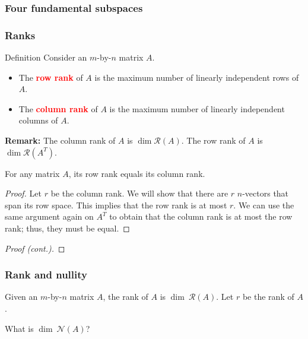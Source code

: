 \begin{frame}
  \frametitle{Four fundamental subspaces}
\end{frame}

\begin{frame}
  \frametitle{Ranks}

  \begin{block}{Definition}
    Consider an $m$-by-$n$ matrix $A$.
    \begin{itemize}
    \item The \textcolor{red}{\bf row rank} of $A$ is the maximum
      number of linearly independent rows of $A$.
    \item The \textcolor{red}{\bf column rank} of $A$ is the maximum
      number of linearly independent columns of $A$.
    \end{itemize}
  \end{block}

  \vspace{0.2in}

  {\bf Remark:} The column rank of $A$ is $\dim {\mathcal R}(A)$.  The
  row rank of $A$ is $\dim {\mathcal R}(A^T)$.
\end{frame}

\begin{frame}
  \begin{theorem}
    For any matrix $A$, its row rank equals its column rank.
  \end{theorem}

  \begin{proof}
    Let $r$ be the column rank.  We will show that there are $r$
    $n$-vectors that span its row space.  This implies that the row
    rank is at most $r$.  We can use the same argument again on $A^T$
    to obtain that the column rank is at most the row rank; thus, they
    must be equal.

    \vspace{1.5in}
  \end{proof}
  
\end{frame}

\begin{frame}
  \begin{proof}[Proof (cont.)]
    \vspace{3in}
  \end{proof}
\end{frame}

\begin{frame}
  \frametitle{Rank and nullity}

  Given an $m$-by-$n$ matrix $A$, the rank of $A$ is $\dim~{\mathcal
    R}(A)$.  Let $r$ be the rank of $A$.

  What is $\dim~{\mathcal N}(A)$?

  \vspace{2.5in}
\end{frame}

